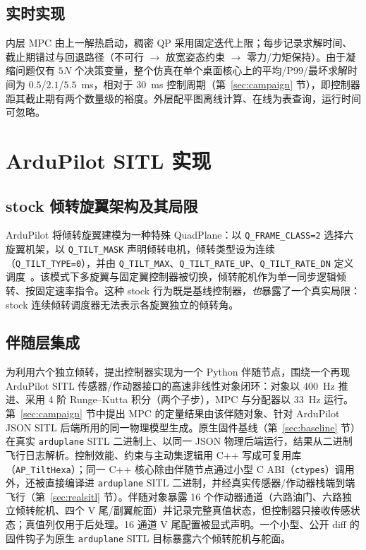 \documentclass[UTF8,a4paper,11pt]{ctexart}
\begin{document}
\subsection{实时实现}\label{sec:realtime}
内层 MPC 由上一解热启动，稠密 QP 采用固定迭代上限；每步记录求解时间、截止期错过与回退路径（不可行 $\rightarrow$ 放宽姿态约束 $\rightarrow$ 零力/力矩保持）。由于凝缩问题仅有 $5N$ 个决策变量，整个仿真在单个桌面核心上的平均/P99/最坏求解时间为 $0.5$/$2.1$/$5.5$~ms，相对于 $30$~ms 控制周期（第~\ref{sec:campaign} 节），即控制器距其截止期有两个数量级的裕度。外层配平图离线计算、在线为表查询，运行时间可忽略。

\section{ArduPilot SITL 实现}\label{sec:sitl}

\subsection{stock 倾转旋翼架构及其局限}\label{sec:stock}
ArduPilot 将倾转旋翼建模为一种特殊 QuadPlane：以 \texttt{Q\_FRAME\_CLASS=2} 选择六旋翼机架，以 \texttt{Q\_TILT\_MASK} 声明倾转电机，倾转类型设为连续（\texttt{Q\_TILT\_TYPE=0}），并由 \texttt{Q\_TILT\_MAX}、\texttt{Q\_TILT\_RATE\_UP}、\texttt{Q\_TILT\_RATE\_DN} 定义调度~\cite{ardupilot2024tilt,ardupilot2024transitions}。该模式下多旋翼与固定翼控制器被切换，倾转舵机作为单一同步逻辑倾转、按固定速率指令。这种 stock 行为既是基线控制器，\emph{也}暴露了一个真实局限：stock 连续倾转调度器无法表示各旋翼独立的倾转角。

\subsection{伴随层集成}\label{sec:companion}
为利用六个独立倾转，提出控制器实现为一个 Python 伴随节点，围绕一个再现 ArduPilot SITL 传感器/作动器接口的高速非线性对象闭环：对象以 400~Hz 推进、采用 4 阶 Runge--Kutta 积分（两个子步），MPC 与分配器以 33~Hz 运行。第~\ref{sec:campaign} 节中提出 MPC 的定量结果由该伴随对象、针对 ArduPilot JSON SITL 后端所用的同一物理模型生成。原生固件基线（第~\ref{sec:baseline} 节）在真实 \texttt{arduplane} SITL 二进制上、以同一 JSON 物理后端运行，结果从二进制飞行日志解析。控制效能、约束与主动集逻辑用 C++ 写成可复用库（\texttt{AP\_TiltHexa}）；同一 C++ 核心除由伴随节点通过小型 C ABI（\texttt{ctypes}）调用外，还被直接编译进 \texttt{arduplane} SITL 二进制，并经真实传感器/作动器栈端到端飞行（第~\ref{sec:realsitl} 节）。伴随对象暴露 16 个作动器通道（六路油门、六路独立倾转舵机、四个 V 尾/副翼舵面）并记录完整真值状态，但控制器只接收传感状态；真值列仅用于后处理。16 通道 V 尾配置被显式声明。一个小型、公开 diff 的固件钩子为原生 \texttt{arduplane} SITL 目标暴露六个倾转舵机与舵面。
\end{document}
